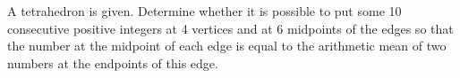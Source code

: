 A tetrahedron is given. Determine whether it is possible to put some 10 consecutive positive integers at 4 vertices and at 6 midpoints of the edges so that the number at the midpoint of each edge is equal to the arithmetic mean of two numbers at the endpoints of this edge.